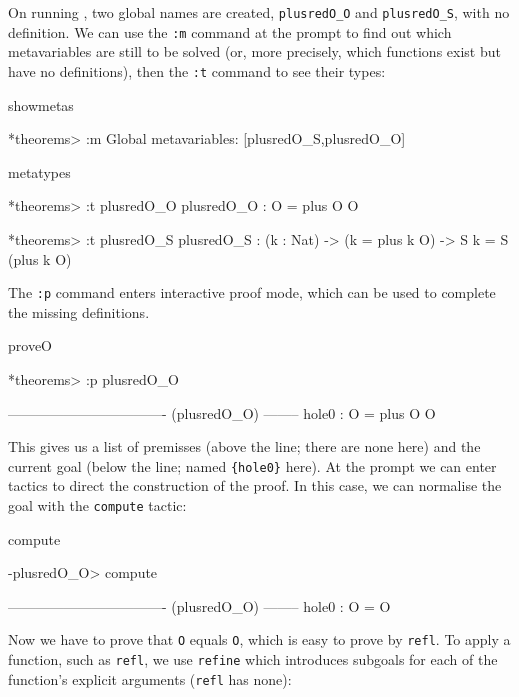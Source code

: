\noindent
On running \Idris{}, two global names are created, \texttt{plusredO\_O} and
\texttt{plusredO\_S}, with no definition. We can use the \texttt{:m} command
at the prompt to find out which metavariables are still to be solved (or, more
precisely, which functions exist but have no definitions), then the
\texttt{:t} command to see their types:

\begin{SaveVerbatim}{showmetas}

*theorems> :m 
Global metavariables:
        [plusredO_S,plusredO_O]

\end{SaveVerbatim}

\begin{SaveVerbatim}{metatypes}

*theorems> :t plusredO_O 
plusredO_O : O = plus O O

*theorems> :t plusredO_S 
plusredO_S : (k : Nat) -> (k = plus k O) -> S k = S (plus k O)

\end{SaveVerbatim}


\noindent
The \texttt{:p} command enters interactive proof mode, which can be used to complete
the missing definitions.

\begin{SaveVerbatim}{proveO}

*theorems> :p plusredO_O

---------------------------------- (plusredO_O) --------
{hole0} : O = plus O O

\end{SaveVerbatim}

\noindent
This gives us a list of premisses 
(above the line; there are none here) and the current goal (below the line;
named \texttt{\{hole0\}} here).
At the prompt we can enter tactics to direct the construction of the proof. In this case,
we can normalise the goal with the \texttt{compute} tactic:

\begin{SaveVerbatim}{compute}

-plusredO_O> compute 

---------------------------------- (plusredO_O) --------
{hole0} : O = O

\end{SaveVerbatim}

\noindent
Now we have to prove that \texttt{O} equals \texttt{O}, which is easy to prove by
\texttt{refl}. To apply a function, such as \texttt{refl}, we use \texttt{refine} 
which introduces subgoals for each of the function's explicit arguments (\texttt{refl}
has none):

